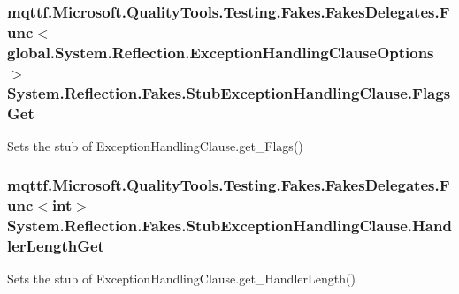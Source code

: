 \hypertarget{class_system_1_1_reflection_1_1_fakes_1_1_stub_exception_handling_clause_acb376e8e3c8bc31da5ac240b1f4ed66d}{
\subsubsection[{Flags\-Get}]{\setlength{\rightskip}{0pt plus 5cm}mqttf.\-Microsoft.\-Quality\-Tools.\-Testing.\-Fakes.\-Fakes\-Delegates.\-Func$<$global.\-System.\-Reflection.\-Exception\-Handling\-Clause\-Options$>$ System.\-Reflection.\-Fakes.\-Stub\-Exception\-Handling\-Clause.\-Flags\-Get}}\label{class_system_1_1_reflection_1_1_fakes_1_1_stub_exception_handling_clause_acb376e8e3c8bc31da5ac240b1f4ed66d}


Sets the stub of Exception\-Handling\-Clause.\-get\-\_\-\-Flags()

\hypertarget{class_system_1_1_reflection_1_1_fakes_1_1_stub_exception_handling_clause_a90fd5fcefeeffe8b83388a15e2caecc0}{
\subsubsection[{Handler\-Length\-Get}]{\setlength{\rightskip}{0pt plus 5cm}mqttf.\-Microsoft.\-Quality\-Tools.\-Testing.\-Fakes.\-Fakes\-Delegates.\-Func$<$int$>$ System.\-Reflection.\-Fakes.\-Stub\-Exception\-Handling\-Clause.\-Handler\-Length\-Get}}\label{class_system_1_1_reflection_1_1_fakes_1_1_stub_exception_handling_clause_a90fd5fcefeeffe8b83388a15e2caecc0}


Sets the stub of Exception\-Handling\-Clause.\-get\-\_\-\-Handler\-Length()

